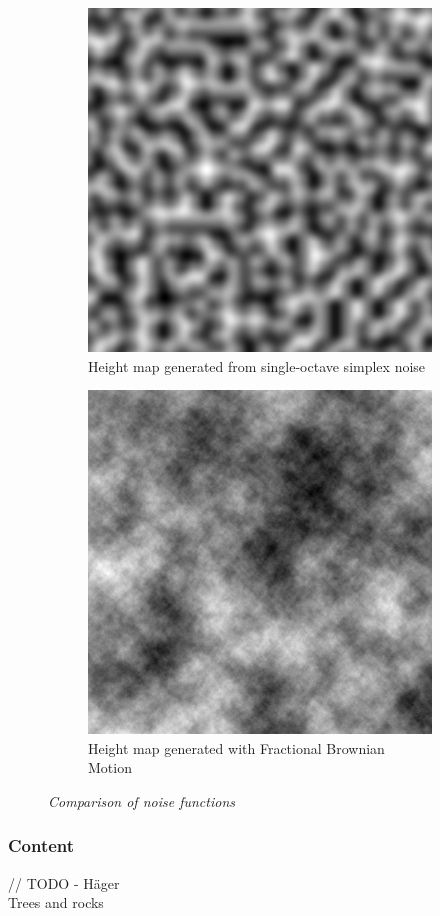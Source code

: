 \begin{figure}[H]

\begin{subfigure}{.5\textwidth}
  \centering
  \includegraphics[width=0.9\linewidth]{images/Simplex.png}
  \caption{Height map generated from single-octave simplex noise}
  \label{fig:sub1}
\end{subfigure}%
\begin{subfigure}{.5\textwidth}
  \centering
  \includegraphics[width=0.9\linewidth]{images/FracBrownMotion.png}
  \caption{Height map generated with Fractional Brownian Motion}
  \label{fig:sub2}
\end{subfigure}
\caption[Noise comparison]{\textit{Comparison of noise functions}}
\label{fig:R_kitchen_example}
\end{figure}

\subsubsection{Content}
// TODO - Häger \\
Trees and rocks 





